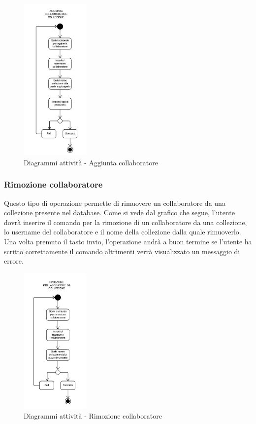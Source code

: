 \documentclass{scalatekids-article}
\begin{document}
\begin{figure}[H]
	\begin{center}
		\includegraphics[width=0.3\textwidth, keepaspectratio]{img/diagrammiAttivita/aggCollaboratore.jpeg}
		\caption{Diagrammi attività - Aggiunta collaboratore}
	\end{center}
\end{figure}

\subsubsection{Rimozione collaboratore}
Questo tipo di operazione permette di rimuovere un collaboratore da una collezione presente nel database.
Come si vede dal grafico che segue, l'utente dovrà inserire il comando per la rimozione di un collaboratore da una collezione, lo username del collaboratore e il nome della collezione dalla quale rimuoverlo.
Una volta premuto il tasto invio, l'operazione andrà a buon termine se l'utente ha scritto correttamente il comando altrimenti verrà visualizzato un messaggio di errore.

\begin{figure}[H]
	\begin{center}
		\includegraphics[width=0.3\textwidth, keepaspectratio]{img/diagrammiAttivita/rimozioneCollaboratore.jpeg}
		\caption{Diagrammi attività - Rimozione collaboratore}
	\end{center}
\end{figure}
\end{document}
